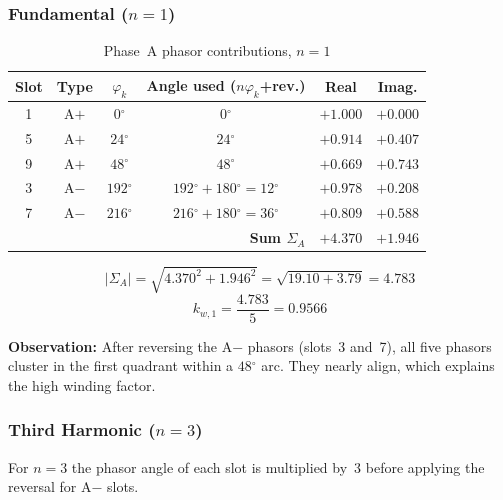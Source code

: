 \documentclass[12pt,a4paper]{article}
\newcommand{\degree}{\ensuremath{^{\circ}}}
\begin{document}
\subsubsection{Fundamental ($n = 1$)}

\begin{table}[H]
  \centering\small
  \caption{Phase~A phasor contributions, $n=1$}
  \label{tab:q2_ph1}
  \begin{tabular}{cccccc}
    \toprule
    Slot & Type & $\varphi_k$ & Angle used ($n\varphi_k$+rev.) & Real & Imag. \\
    \midrule
    1 & A$+$ & $  0\degree$ & $  0\degree$          & $+1.000$ & $+0.000$ \\
    5 & A$+$ & $ 24\degree$ & $ 24\degree$          & $+0.914$ & $+0.407$ \\
    9 & A$+$ & $ 48\degree$ & $ 48\degree$          & $+0.669$ & $+0.743$ \\
    3 & A$-$ & $192\degree$ & $192\degree+180\degree=12\degree$ & $+0.978$ & $+0.208$ \\
    7 & A$-$ & $216\degree$ & $216\degree+180\degree=36\degree$ & $+0.809$ & $+0.588$ \\
    \midrule
    \multicolumn{4}{r}{\textbf{Sum $\Sigma_A$}} & $+4.370$ & $+1.946$ \\
    \bottomrule
  \end{tabular}
\end{table}
\begin{equation}
  |\Sigma_A| = \sqrt{4.370^2 + 1.946^2} = \sqrt{19.10 + 3.79} = 4.783
\end{equation}
\begin{equation}
  \boxed{k_{w,1} = \frac{4.783}{5} = 0.9566}
\end{equation}

\noindent\textbf{Observation:} After reversing the A$-$ phasors (slots~3 and~7),
all five phasors cluster in the first quadrant within a $48\degree$ arc.
They nearly align, which explains the high winding factor.

\subsubsection{Third Harmonic ($n = 3$)}

For $n=3$ the phasor angle of each slot is multiplied by~3 before applying
the reversal for A$-$ slots.
\end{document}

